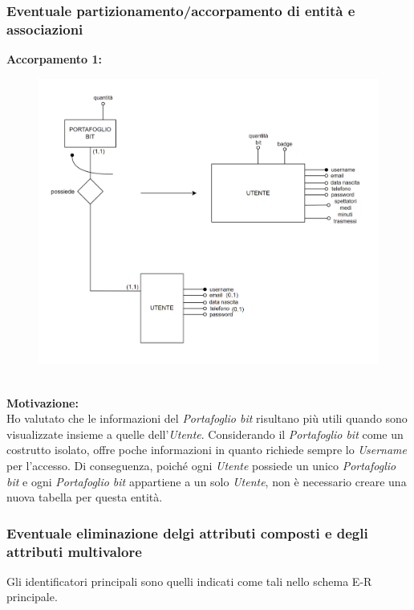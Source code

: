 \newpage
\subsubsection{Eventuale partizionamento/accorpamento di entità e associazioni}
\textbf{Accorpamento 1:}\\
\begin{figure}[h]
    \centering
    \includegraphics[scale = 0.5]{img/accorpamento1.png}
\end{figure}\\
\textbf{Motivazione:}\\
Ho valutato che le informazioni del \textit{Portafoglio bit} risultano più utili quando sono visualizzate insieme a quelle dell'\textit{Utente}. Considerando il \textit{Portafoglio bit} come un costrutto isolato, offre poche informazioni in quanto richiede sempre lo \textit{Username} per l'accesso. Di conseguenza, poiché ogni \textit{Utente} possiede un unico \textit{Portafoglio bit} e ogni \textit{Portafoglio bit} appartiene a un solo \textit{Utente}, non è necessario creare una nuova tabella per questa entità.



\subsubsection{Eventuale eliminazione delgi attributi composti e degli attributi multivalore}
Gli identificatori principali sono quelli indicati come tali nello schema E-R principale.

